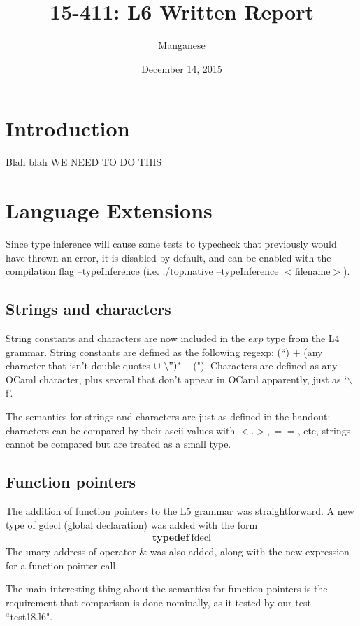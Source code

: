 \documentclass{article}
\title{15-411: L6 Written Report}
\author{Manganese}
\date{December 14, 2015}
\begin{document}
\maketitle

\section{Introduction}

Blah blah WE NEED TO DO THIS\\
\section{Language Extensions}

Since type inference will cause some tests to typecheck that previously would have thrown an error, it is disabled by default, and can be enabled with the compilation flag --typeInference (i.e. ./top.native --typeInference $<$filename$>$).\\

\subsection{Strings and characters}
String constants and characters are now included in the $exp$ type from the L4 grammar. String constants are defined as the following regexp: (``) + (any character that isn't double quotes $\cup \  \backslash")^*$ +("). Characters are defined as any OCaml character, plus several that don't appear in OCaml apparently, just as `$\backslash$ f'.

The semantics for strings and characters are just as defined in the handout: characters can be compared by their ascii values with $<. >, ==$, etc, strings cannot be compared but are treated as a small type.

\subsection{Function pointers}
The addition of function pointers to the L5 grammar was straightforward. A new type of gdecl (global declaration) was added with the form \begin{align*}
\textbf{typedef} \ \textrm{fdecl}
\end{align*}
The unary address-of operator $\&$ was also added, along with the new expression for a function pointer call.

The main interesting thing about the semantics for function pointers is the requirement that comparison is done nominally, as it tested by our test ``test18.l6".
\end{document}
